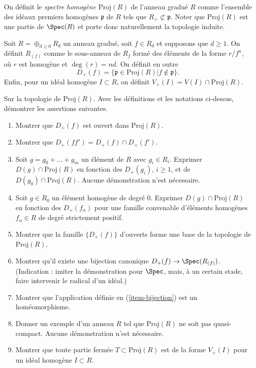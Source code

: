 \begin{definition}
\label{definition-Proj-R}
On définit le {\it spectre homogène $\text{Proj}(R)$}
de l'anneau gradué $R$ comme l'ensemble des idéaux premiers homogènes
${\mathfrak p}$ de $R$ tels que $R_{+} \not \subset {\mathfrak p}$.
Noter que $\text{Proj}(R)$ est une partie de $\Spec(R)$ et porte donc naturellement
la topologie induite.
\end{definition}

\begin{definition}
\label{definition-Dplus-Vplus}
Soit $R = \oplus_{d \geq 0} R_d$ un anneau gradué, soit $f\in R_d$ et
supposons que $d \geq 1$. On définit {\it $R_{(f)}$} comme le sous-anneau de
$R_f$ formé des éléments de la forme $r/f^n$, où $r$ est homogène et
$\deg(r) = nd$. On définit en outre
$$
D_{+}(f) = \{ {\mathfrak p} \in \text{Proj}(R) | f \not\in {\mathfrak p} \}.
$$
Enfin, pour un idéal homogène $I \subset R$, on définit
$V_{+}(I) = V(I) \cap \text{Proj}(R)$.
\end{definition}

\begin{exercise}
\label{exercise-topology-proj}
Sur la topologie de $\text{Proj}(R)$. Avec les définitions et les notations
ci-dessus, démontrer les assertions suivantes.
\begin{enumerate}
\item Montrer que $D_{+}(f)$ est ouvert dans $\text{Proj}(R)$.
\item Montrer que $D_{+}(ff') = D_{+}(f) \cap D_{+}(f')$.
\item Soit $g = g_0 + \ldots + g_m$ un élément
de $R$ avec $g_i \in R_i$. Exprimer $D(g) \cap \text{Proj}(R)$
en fonction des $D_{+}(g_i)$, $i \geq 1$, et de $D(g_0) \cap \text{Proj}(R)$.
Aucune démonstration n'est nécessaire.
\item Soit $g\in R_0$ un élément homogène de degré $0$.
Exprimer $D(g) \cap \text{Proj}(R)$ en fonction des $D_{+}(f_\alpha)$
pour une famille convenable d'éléments homogènes $f_\alpha \in R$
de degré strictement positif.
\item Montrer que la famille $\{D_{+}(f)\}$ d'ouverts forme une
base de la topologie de $\text{Proj}(R)$.
\item
\label{item-bijection}
Montrer qu'il existe une bijection canonique $D_{+}(f) \to \Spec(R_{(f)})$.
(Indication : imiter la démonstration pour $\Spec$, mais, à un certain stade, faire intervenir le
radical d'un idéal.)
\item Montrer que l'application définie en (\ref{item-bijection}) est un homéomorphisme.
\item Donner un exemple d'un anneau $R$ tel que $\text{Proj}(R)$ ne soit pas
quasi-compact. Aucune démonstration n'est nécessaire.
\item Montrer que toute partie fermée $T \subset \text{Proj}(R)$ est de
la forme $V_{+}(I)$ pour un idéal homogène $I \subset R$.
\end{enumerate}
\end{exercise}

